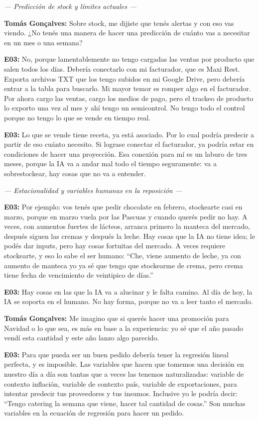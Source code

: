 \noindent\textit{--- Predicción de stock y límites actuales ---}

\noindent\textbf{Tomás Gonçalves:} Sobre stock, me dijiste que tenés alertas y con eso vas viendo. ¿No tenés una manera de hacer una predicción de cuánto vas a necesitar en un mes o una semana?

\noindent\textbf{E03:} No, porque lamentablemente no tengo cargadas las ventas por producto que salen todos los días. Debería conectarlo con mi facturador, que es Maxi Rest. Exporta archivos TXT que los tengo subidos en mi Google Drive, pero debería entrar a la tabla para buscarlo. Mi mayor temor es romper algo en el facturador. Por ahora cargo las ventas, cargo los medios de pago, pero el trackeo de producto lo exporto una vez al mes y ahí tengo un semicontrol. No tengo todo el control porque no tengo lo que se vende en tiempo real.

\noindent\textbf{E03:} Lo que se vende tiene receta, ya está asociado. Por lo cual podría predecir a partir de eso cuánto necesito. Si lograse conectar el facturador, ya podría estar en condiciones de hacer una proyección. Esa conexión para mí es un laburo de tres meses, porque la IA va a andar mal todo el tiempo seguramente: va a sobrestockear, hay cosas que no va a entender.

\noindent\textit{--- Estacionalidad y variables humanas en la reposición ---}

\noindent\textbf{E03:} Por ejemplo: vos tenés que pedir chocolate en febrero, stockearte casi en marzo, porque en marzo vuela por las Pascuas y cuando querés pedir no hay. A veces, con aumentos fuertes de lácteos, arranca primero la manteca del mercado, después siguen las cremas y después la leche. Hay cosas que la IA no tiene idea; le podés dar inputs, pero hay cosas fortuitas del mercado. A veces requiere stockearte, y eso lo sabe el ser humano: ``Che, viene aumento de leche, ya con aumento de manteca yo ya sé que tengo que stockearme de crema, pero crema tiene fecha de vencimiento de veintipico de días.''

\noindent\textbf{E03:} Hay cosas en las que la IA va a alucinar y le falta camino. Al día de hoy, la IA se soporta en el humano. No hay forma, porque no va a leer tanto el mercado.

\noindent\textbf{Tomás Gonçalves:} Me imagino que si querés hacer una promoción para Navidad o lo que sea, es más en base a la experiencia: yo sé que el año pasado vendí esta cantidad y este año lanzo algo parecido.

\noindent\textbf{E03:} Para que pueda ser un buen pedido debería tener la regresión lineal perfecta, y es imposible. Las variables que hacen que tomemos una decisión en nuestro día a día son tantas que a veces las tenemos naturalizadas: variable de contexto inflación, variable de contexto país, variable de exportaciones, para intentar predecir tus proveedores y tus insumos. Inclusive yo le podría decir: ``Tengo catering la semana que viene, hacer tal cantidad de cosas.'' Son muchas variables en la ecuación de regresión para hacer un pedido.

